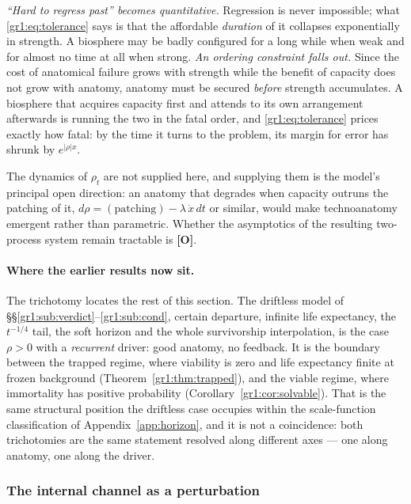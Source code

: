 \documentclass[11pt]{article}
\numberwithin{equation}{section}
\theoremstyle{plain}
\theoremstyle{definition}
\theoremstyle{remark}
\begin{document}
\emph{``Hard to regress past'' becomes quantitative.} Regression is
never impossible; what \eqref{gr1:eq:tolerance} says is that the
affordable \emph{duration} of it collapses exponentially in strength. A
biosphere may be badly configured for a long while when weak and for
almost no time at all when strong. \emph{An ordering constraint falls out.} Since the cost of anatomical
failure grows with strength while the benefit of capacity does not
grow with anatomy, anatomy must be secured \emph{before} strength
accumulates. A biosphere that acquires capacity first and attends to
its own arrangement afterwards is running the two in the fatal order,
and \eqref{gr1:eq:tolerance} prices exactly how fatal: by the time it
turns to the problem, its margin for error has shrunk by
$e^{|\rho|x}$.

\noindent The dynamics of $\rho_t$ are not supplied here, and supplying
them is the model's principal open direction: an anatomy that degrades
when capacity outruns the patching of it, $d\rho=(\text{patching})-
\lambda\,\dot x\,dt$ or similar, would make technoanatomy emergent
rather than parametric. Whether the asymptotics of the resulting
two-process system remain tractable is \textbf{[O]}.

\paragraph{Where the earlier results now sit.}\label{gr1:rem:wherenow}
The trichotomy locates the rest of this section. The driftless model of
\S\S\ref{gr1:sub:verdict}--\ref{gr1:sub:cond}, certain departure,
infinite life expectancy, the $t^{-1/4}$ tail, the soft horizon and the
whole survivorship interpolation, is the case $\rho>0$ with a
\emph{recurrent} driver: good anatomy, no feedback. It is the boundary
between the trapped regime, where viability is zero and life expectancy
finite at frozen background (Theorem~\ref{gr1:thm:trapped}), and the
viable regime, where
immortality has positive probability
(Corollary~\ref{gr1:cor:solvable}). That is the same structural position
the driftless case occupies within the scale-function classification of
Appendix~\ref{app:horizon}, and it is not a coincidence: both
trichotomies are the same statement resolved along different axes ---
one along anatomy, one along the driver.

\subsubsection{The internal channel as a perturbation}
\label{gr1:subsub:perturb}
\end{document}
